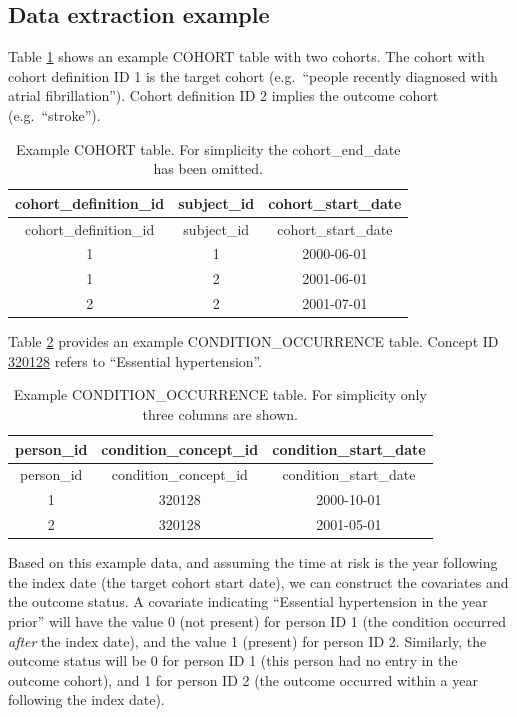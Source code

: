 \documentclass[11pt]{book}
\theoremstyle{definition}
\theoremstyle{definition}
\theoremstyle{definition}
\theoremstyle{remark}
\begin{document}
\hypertarget{data-extraction-example}{%
\subsection{Data extraction example}\label{data-extraction-example}}

Table \ref{tab:plpExampleCohorts} shows an example COHORT table with two cohorts. The cohort with cohort definition ID 1 is the target cohort (e.g.~``people recently diagnosed with atrial fibrillation''). Cohort definition ID 2 implies the outcome cohort (e.g.~``stroke'').

\begin{longtable}[]{@{}ccc@{}}
\caption{\label{tab:plpExampleCohorts} Example COHORT table. For simplicity the cohort\_end\_date has been omitted.}\tabularnewline
\toprule
cohort\_definition\_id & subject\_id & cohort\_start\_date\tabularnewline
\midrule
\endfirsthead
\toprule
cohort\_definition\_id & subject\_id & cohort\_start\_date\tabularnewline
\midrule
\endhead
1 & 1 & 2000-06-01\tabularnewline
1 & 2 & 2001-06-01\tabularnewline
2 & 2 & 2001-07-01\tabularnewline
\bottomrule
\end{longtable}

Table \ref{tab:plpExampleConditions} provides an example CONDITION\_OCCURRENCE table. Concept ID \href{http://athena.ohdsi.org/search-terms/terms/320128}{320128} refers to ``Essential hypertension''.

\begin{longtable}[]{@{}ccc@{}}
\caption{\label{tab:plpExampleConditions} Example CONDITION\_OCCURRENCE table. For simplicity only three columns are shown.}\tabularnewline
\toprule
person\_id & condition\_concept\_id & condition\_start\_date\tabularnewline
\midrule
\endfirsthead
\toprule
person\_id & condition\_concept\_id & condition\_start\_date\tabularnewline
\midrule
\endhead
1 & 320128 & 2000-10-01\tabularnewline
2 & 320128 & 2001-05-01\tabularnewline
\bottomrule
\end{longtable}

Based on this example data, and assuming the time at risk is the year following the index date (the target cohort start date), we can construct the covariates and the outcome status. A covariate indicating ``Essential hypertension in the year prior'' will have the value 0 (not present) for person ID 1 (the condition occurred \emph{after} the index date), and the value 1 (present) for person ID 2. Similarly, the outcome status will be 0 for person ID 1 (this person had no entry in the outcome cohort), and 1 for person ID 2 (the outcome occurred within a year following the index date).
\end{document}
